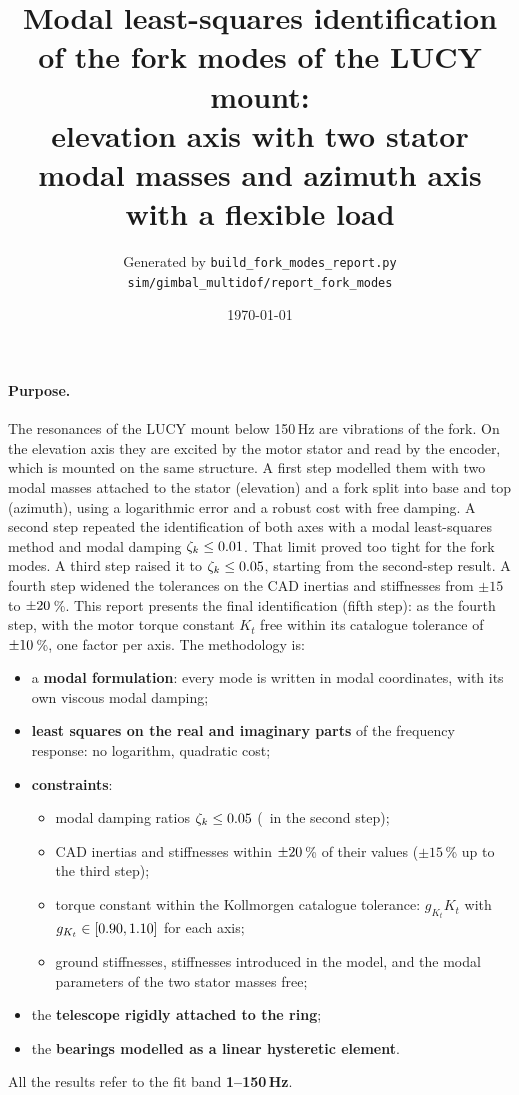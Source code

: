 \documentclass[10pt,a4paper]{article}
\title{Modal least-squares identification of the fork modes of the LUCY mount:\\ elevation axis with two stator modal masses and azimuth axis with a flexible load}
\author{Generated by \texttt{build\_fork\_modes\_report.py}\\ \small\texttt{sim/gimbal\_multidof/report\_fork\_modes}}
\date{\today}
\numberwithin{equation}{section}
\begin{document}
\maketitle

\paragraph{Purpose.} The resonances of the LUCY mount below 150\,Hz are vibrations of the fork. On the elevation axis they are excited by the motor stator and read by the encoder, which is mounted on the same structure. A first step modelled them with two modal masses attached to the stator (elevation) and a fork split into base and top (azimuth), using a logarithmic error and a robust cost with free damping. A second step repeated the identification of both axes with a modal least-squares method and modal damping $\zeta_k\leq0.01$. That limit proved too tight for the fork modes. A third step raised it to $\zeta_k\leq0.05$, starting from the second-step result. A fourth step widened the tolerances on the CAD inertias and stiffnesses from $\pm15$ to $\pm20$\,\%. This report presents the final identification (fifth step): as the fourth step, with the motor torque constant $K_t$ free within its catalogue tolerance of $\pm10$\,\%, one factor per axis. The methodology is:
\begin{itemize}
\item a \textbf{modal formulation}: every mode is written in modal coordinates, with its own viscous modal damping;
\item \textbf{least squares on the real and imaginary parts} of the frequency response: no logarithm, quadratic cost;
\item \textbf{constraints}:
  \begin{itemize}
  \item modal damping ratios $\zeta_k\leq0.05$ (\zetaMaxStep\ in the second step);
  \item CAD inertias and stiffnesses within $\pm20$\,\% of their values ($\pm15$\,\% up to the third step);
  \item torque constant within the Kollmorgen catalogue tolerance: $g_{K_t}K_t$ with $g_{K_t}\in[0.90,1.10]$ for each axis;
  \item ground stiffnesses, stiffnesses introduced in the model, and the modal parameters of the two stator masses free;
  \end{itemize}
\item the \textbf{telescope rigidly attached to the ring};
\item the \textbf{bearings modelled as a linear hysteretic element}.
\end{itemize}
All the results refer to the fit band \textbf{1--150\,Hz}.
\end{document}
